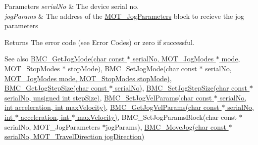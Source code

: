 \begin{DoxyParams}{Parameters}
{\em serial\+No} & The device serial no. \\
\hline
{\em jog\+Params} & The address of the \hyperlink{struct_m_o_t___jog_parameters}{M\+O\+T\+\_\+\+Jog\+Parameters} block to recieve the jog parameters \\
\hline
\end{DoxyParams}
\begin{DoxyReturn}{Returns}
The error code (see Error Codes) or zero if successful. 
\end{DoxyReturn}
\begin{DoxySeeAlso}{See also}
\hyperlink{group___k_cube_brushless_motor_gafc92fe606b9cd874d7f28d7791e8a06e}{B\+M\+C\+\_\+\+Get\+Jog\+Mode(char const $\ast$ serial\+No, M\+O\+T\+\_\+\+Jog\+Modes $\ast$ mode, M\+O\+T\+\_\+\+Stop\+Modes $\ast$ stop\+Mode)}, \hyperlink{group___k_cube_brushless_motor_ga5cc6ed2932a1761531546d41a9240136}{B\+M\+C\+\_\+\+Set\+Jog\+Mode(char const $\ast$ serial\+No, M\+O\+T\+\_\+\+Jog\+Modes mode, M\+O\+T\+\_\+\+Stop\+Modes stop\+Mode)}, \hyperlink{group___k_cube_brushless_motor_ga2a2db2c5c7f24bbff73f17af4e10bdd1}{B\+M\+C\+\_\+\+Get\+Jog\+Step\+Size(char const $\ast$ serial\+No)}, \hyperlink{group___k_cube_brushless_motor_gaeff03c620c9c2a0719c58dc9d97ed8c3}{B\+M\+C\+\_\+\+Set\+Jog\+Step\+Size(char const $\ast$ serial\+No, unsigned int step\+Size)}, \hyperlink{group___k_cube_brushless_motor_ga5344f441c200c330ef267401054c307e}{B\+M\+C\+\_\+\+Set\+Jog\+Vel\+Params(char const $\ast$ serial\+No, int acceleration, int max\+Velocity)}, \hyperlink{group___k_cube_brushless_motor_ga096d9f530ba9e298f7c687a891b6182f}{B\+M\+C\+\_\+\+Get\+Jog\+Vel\+Params(char const $\ast$ serial\+No, int $\ast$ acceleration, int $\ast$ max\+Velocity)}, B\+M\+C\+\_\+\+Set\+Jog\+Params\+Block(char const $\ast$ serial\+No, M\+O\+T\+\_\+\+Jog\+Parameters $\ast$jog\+Params), \hyperlink{group___k_cube_brushless_motor_gae7854ca7daacf191f792adff135f1dcd}{B\+M\+C\+\_\+\+Move\+Jog(char const $\ast$ serial\+No, M\+O\+T\+\_\+\+Travel\+Direction jog\+Direction)}


\end{DoxySeeAlso}

\begin{DoxyCodeInclude}
\end{DoxyCodeInclude}
